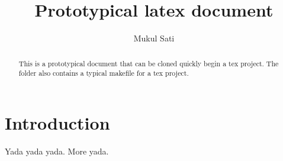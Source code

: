 \documentclass{article}
\title{Prototypical latex document}
\author{Mukul Sati}
\begin{document}
\maketitle

\begin{abstract}
This is a prototypical document that can be cloned quickly begin a tex project.
The folder also contains a typical makefile for a tex project.


\end{abstract}

\section{Introduction}
Yada yada yada. More yada.


\end{document}
